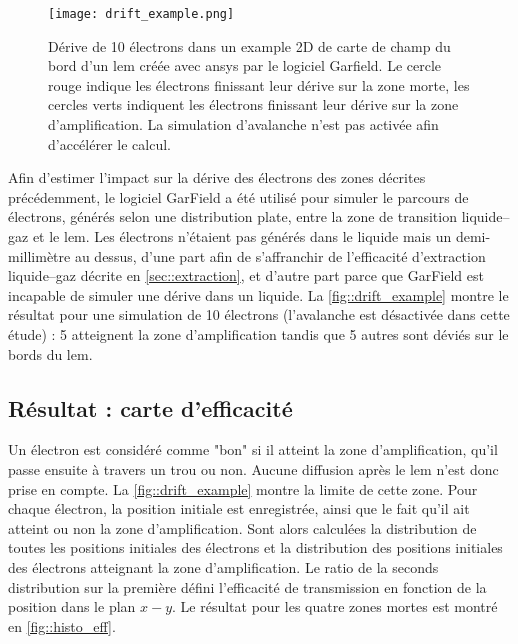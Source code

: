         \begin{figure}[htpb]
          \centering
          \texttt{[image: drift\_example.png]}
          \caption[Dérive de 10 électrons dans la carte de champ du bord d'un \gls{lem} avec Garfield.]{Dérive de 10 électrons dans un example 2D de carte de champ du bord d'un \gls{lem} créée avec \gls{ansys} par le logiciel Garfield. Le cercle rouge indique les électrons finissant leur dérive sur la zone morte, les cercles verts indiquent les électrons finissant leur dérive sur la zone d'amplification. La simulation d'avalanche n'est pas activée afin d'accélérer le calcul.}
          \label{fig::drift_example}
        \end{figure}
                
        Afin d'estimer l'impact sur la dérive des électrons des zones décrites précédemment, le logiciel GarField \cite{garfield} a été utilisé pour simuler le parcours de  électrons, générés selon une distribution plate, entre la zone de transition liquide--gaz et le \gls{lem}. Les électrons n'étaient pas générés dans le liquide mais un demi-millimètre au dessus, d'une part afin de s'affranchir de l'efficacité d'extraction liquide--gaz décrite en \autoref{sec::extraction}, et d'autre part parce que GarField est incapable de simuler une dérive dans un liquide. La \autoref{fig::drift_example} montre le résultat pour une simulation de 10 électrons (l'avalanche est désactivée dans cette étude) : 5 atteignent la zone d'amplification tandis que 5 autres sont déviés sur le bords du \gls{lem}.
                
    \subsection{Résultat : carte d'efficacité}
        
      Un électron est considéré comme "bon" si il atteint la zone d'amplification, qu'il passe ensuite à travers un trou ou non. Aucune diffusion après le \gls{lem} n'est donc prise en compte. La \autoref{fig::drift_example} montre la limite de cette zone. Pour chaque électron, la position initiale est enregistrée, ainsi que le fait qu'il ait atteint ou non la zone d'amplification. Sont alors calculées la distribution de toutes les positions initiales des électrons et la distribution des positions initiales des électrons atteignant la zone d'amplification. Le ratio de la seconds distribution sur la première défini l'efficacité de transmission en fonction de la position dans le plan $x-y$. Le résultat pour les quatre zones mortes est montré en \autoref{fig::histo_eff}.
            
